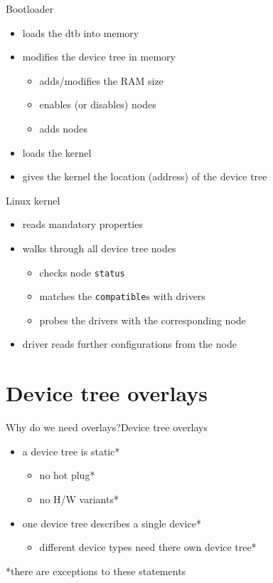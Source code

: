 \documentclass[aspectratio=169]{beamer}
\newcommand{\sectiontitle}{}
\newcommand{\newsection}[1]{\renewcommand{\sectiontitle}{#1}\section{#1}}
\begin{document}
\begin{frame}{Bootloader}{\sectiontitle}
\begin{itemize}
    \item loads the dtb into memory
    \item modifies the device tree in memory
    \begin{itemize}
        \item adds/modifies the RAM size
        \item enables (or disables) nodes
        \item adds nodes
    \end{itemize}
    \item loads the kernel
    \item gives the kernel the location (address) of the device tree
\end{itemize}
\end{frame}

\begin{frame}[fragile]{Linux kernel}{\sectiontitle}
\begin{itemize}
    \item reads mandatory properties
    \item walks through all device tree nodes
    \begin{itemize}
        \item checks node \verb|status|
        \item matches the \verb|compatible|s with drivers
        \item probes the drivers with the corresponding node
    \end{itemize}
    \item driver reads further configurations from the node
\end{itemize}
\end{frame}


\newsection{Device tree overlays}
\begin{frame}{Why do we need overlays?}{\sectiontitle}
\begin{itemize}
    \item a device tree is static*
    \begin{itemize}
        \item no hot plug*
        \item no H/W variants*
    \end{itemize}
    \item one device tree describes a single device*
    \begin{itemize}
        \item different device types need there own device tree*
    \end{itemize}
\end{itemize}
\footnotesize{*there are exceptions to these statements}
\end{frame}
\end{document}
